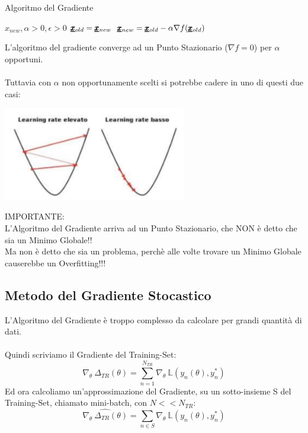 \begin{algorithm}
\caption{Algoritmo del Gradiente}
\begin{algorithmic}
 $x_{new}, \alpha >0, \epsilon >0$ 
\Repeat
\State $\pmb{\underline{x}}_{old} = \pmb{\underline{x}}_{new}$
\State $\pmb{\underline{x}}_{new} = \pmb{\underline{x}}_{old} - \alpha \nabla f(\pmb{\underline{x}}_{old})$
\end{algorithmic}
\end{algorithm}
L’algoritmo del gradiente converge ad un Punto Stazionario ($\nabla f = 0$) per $\alpha$ opportuni.\\ \\
Tuttavia con $\alpha$ non opportunamente scelti si potrebbe cadere in uno di questi due casi:
\begin{center}
    \includegraphics[width=0.6\textwidth]{Images/AlfaInopportuni.png}

IMPORTANTE: \\L'Algoritmo del Gradiente arriva ad un Punto Stazionario, che NON è detto che sia un Minimo Globale!!\\
Ma non è detto che sia un problema, perchè alle volte trovare un Minimo Globale causerebbe un Overfitting!!!
\end{center}

\subsection{Metodo del Gradiente Stocastico}
L'Algoritmo del Gradiente è troppo complesso da calcolare per grandi quantità di dati.\\ \\
Quindi scriviamo il Gradiente del Training-Set:
\begin{equation*}
    \nabla_{\theta} \ \Delta_{TR}(\theta) = \sum_{n=1}^{N_{TR}} \nabla_{\theta} \ \mathbb{L}(y_n (\theta), y_n^*)
\end{equation*}
Ed ora calcoliamo un'approssimazione del Gradiente, su un sotto-insieme S del Training-Set, chiamato mini-batch, con $N << N_{TR}$:
\begin{equation*}
    \widehat{\nabla_{\theta} \ \Delta_{TR}(\theta)} = \sum_{n \in S} \nabla_{\theta} \ \mathbb{L}(y_n (\theta), y_n^*)
\end{equation*}
